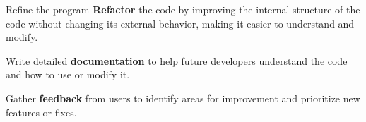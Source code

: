 \documentclass[sectionframe]{oxblue-beamer}
\begin{document}
\begin{frame}{Refine the program}
\textbf{Refactor} the code by improving the internal structure of the code without changing its external behavior, making it easier to understand and modify.

\bigskip Write detailed \textbf{documentation} to help future developers understand the code and how to use or modify it.

\bigskip Gather \textbf{feedback} from users to identify areas for improvement and prioritize new features or fixes.
\end{frame}
\end{document}
